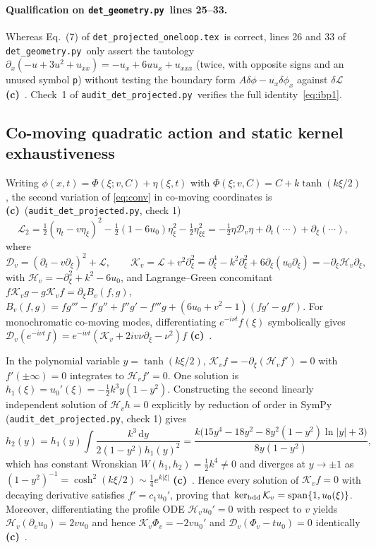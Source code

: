 \documentclass[11pt,a4paper]{article}
\newcommand{\Lc}{\textsf{\textbf{(c)}}\ }
\newcommand{\scr}{\texttt{audit\_\allowbreak det\_\allowbreak projected.py}}
\newcommand{\pkgtex}{\texttt{det\_\allowbreak projected\_\allowbreak oneloop.tex}}
\newcommand{\G}{\texttt{det\_\allowbreak geometry.py}}
\newcommand{\dd}{\mathrm d}
\begin{document}
\paragraph{Qualification on \G\ lines 25--33.}
Whereas Eq.~(7) of \pkgtex\ is correct, lines 26 and
33 of \G\ only assert the tautology
$\partial_x(-u+3u^2+u_{xx})=-u_x+6uu_x+u_{xxx}$ (twice, with opposite signs and
an unused symbol \texttt{p}) without testing the boundary form
$A\delta\phi-u_x\delta\phi_x$ against $\delta\mathcal L$ \Lc. Check~1 of \scr\
verifies the full identity~\eqref{eq:ibp1}.

\subsection{Co-moving quadratic action and static kernel exhaustiveness}
Writing $\phi(x,t)=\Phi(\xi;v,C)+\eta(\xi,t)$ with
$\Phi(\xi;v,C)=C+k\tanh(k\xi/2)$, the second variation of \eqref{eq:conv} in
co-moving coordinates is \Lc (\scr, check 1)
\begin{equation}\label{eq:L2}
 \mathcal L_2 = \tfrac12(\eta_t-v\eta_\xi)^2-\tfrac12(1-6u_0)\eta_\xi^2-\tfrac12\eta_{\xi\xi}^2
 = -\tfrac12\eta\mathcal D_v\eta + \partial_t(\cdots) + \partial_\xi(\cdots),
\end{equation}
where
\begin{equation}\label{eq:DvKv}
 \mathcal D_v=(\partial_t-v\partial_\xi)^2+\mathcal L,\qquad
 \mathcal K_v=\mathcal L+v^2\partial_\xi^2
 =\partial_\xi^4-k^2\partial_\xi^2+6\partial_\xi(u_0\partial_\xi)
 =-\partial_\xi\mathcal H_v\partial_\xi,
\end{equation}
with $\mathcal H_v=-\partial_\xi^2+k^2-6u_0$, and Lagrange--Green concomitant
$f\mathcal K_vg-g\mathcal K_vf=\partial_\xi B_v(f,g)$,
$B_v(f,g)=fg'''-f'g''+f''g'-f'''g+(6u_0+v^2-1)(fg'-gf')$. For monochromatic
co-moving modes, differentiating $e^{-i\nu t}f(\xi)$ symbolically gives
$\mathcal D_v(e^{-i\nu t}f)=e^{-i\nu t}(\mathcal K_v+2iv\nu\partial_\xi-\nu^2)f$ \Lc.

In the polynomial variable $y=\tanh(k\xi/2)$, $\mathcal K_v f=-\partial_\xi(\mathcal H_v f')=0$
with $f'(\pm\infty)=0$ integrates to $\mathcal H_v f'=0$. One solution is
$h_1(\xi)=u_0'(\xi)=-\tfrac12k^3y(1-y^2)$. Constructing the second linearly
independent solution of $\mathcal H_v h=0$ explicitly by reduction of order in
SymPy (\scr, check 1) gives
\begin{equation}\label{eq:h2}
 h_2(y)=h_1(y)\int\frac{k^3\,\dd y}{2(1-y^2)h_1(y)^2}
 =\frac{k\big(15y^4-18y^2-8y^2(1-y^2)\ln|y|+3\big)}{8y(1-y^2)},
\end{equation}
which has constant Wronskian $W(h_1,h_2)=\tfrac12k^4\ne0$ and diverges at
$y\to\pm1$ as $(1-y^2)^{-1}=\cosh^2(k\xi/2)\sim\tfrac14e^{k|\xi|}$ \Lc. Hence
every solution of $\mathcal K_v f=0$ with decaying derivative satisfies
$f'=c_1 u_0'$, proving that $\ker_{\rm bdd}\mathcal K_v=\operatorname{span}\{1,u_0(\xi)\}$.
Moreover, differentiating the profile ODE $\mathcal H_v u_0'=0$ with respect to
$v$ yields $\mathcal H_v(\partial_v u_0)=2v u_0$ and hence
$\mathcal K_v\Phi_v=-2v u_0'$ and $\mathcal D_v(\Phi_v-tu_0)=0$ identically \Lc.
\end{document}
